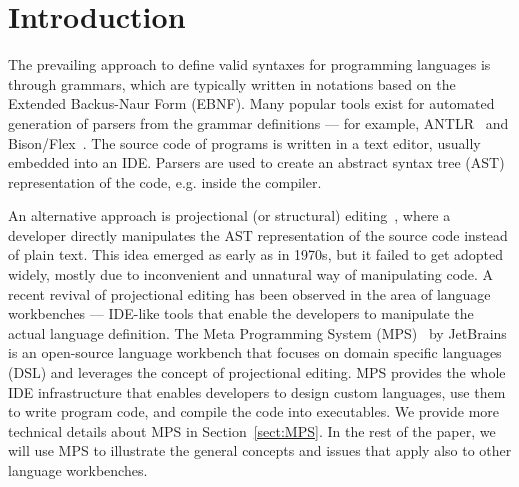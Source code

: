 \section{Introduction}

The prevailing approach to define valid syntaxes for programming languages is through grammars, which are typically written in notations based on the Extended Backus-Naur Form (EBNF).
Many popular tools exist for automated generation of parsers from the grammar definitions --- for example, ANTLR~\cite{ref:ANTLRBOOK,ref:ANTLR} and Bison/Flex~\cite{ref:BISONFLEX}.
The source code of programs is written in a text editor, usually embedded into an IDE. Parsers are used to create an abstract syntax tree (AST) representation of the code, e.g. inside the compiler.

An alternative approach is projectional (or structural) editing~\cite{ref:VWK15}, where a developer directly manipulates the AST representation of the source code instead of plain text.
This idea emerged as early as in 1970s, but it failed to get adopted widely, mostly due to inconvenient and unnatural way of manipulating code.
A recent revival of projectional editing has been observed in the area of language workbenches --- IDE-like tools that enable the developers to manipulate the actual language definition.
The Meta Programming System (MPS)~\cite{ref:MPS,ref:MPSBOOK} by JetBrains is an open-source language workbench that focuses on domain specific languages (DSL) and leverages the concept of projectional editing.
MPS provides the whole IDE infrastructure that enables developers to design custom languages, use them to write program code, and compile the code into executables.
We provide more technical details about MPS in Section~\ref{sect:MPS}.
In the rest of the paper, we will use MPS to illustrate the general concepts and issues that apply also to other language workbenches.


